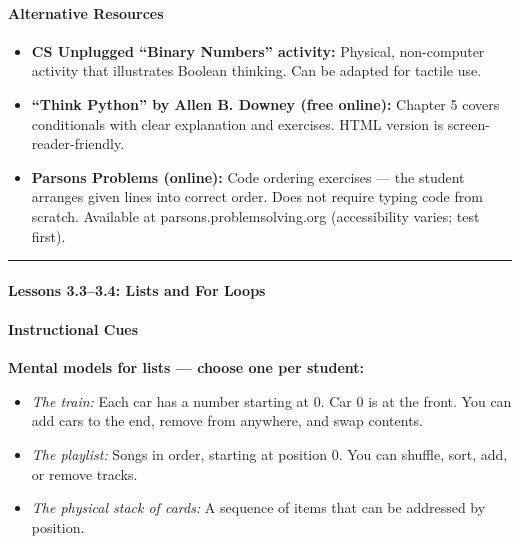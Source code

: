 \documentclass[
  justified,
  openright,
]{tufte-book}
\let\subsection\paragraph
\let\paragraph\paragraph
\let\subsection\paragraph
\let\paragraph\paragraph
\providecommand{\tightlist}{%
  \setlength{\itemsep}{0pt}\setlength{\parskip}{0pt}}
\begin{document}
\paragraph{Alternative Resources}\label{alternative-resources-2}

\begin{itemize}
\tightlist
\item
  \textbf{CS Unplugged ``Binary Numbers'' activity:} Physical,
  non-computer activity that illustrates Boolean thinking. Can be
  adapted for tactile use.
\item
  \textbf{``Think Python'' by Allen B. Downey (free online):} Chapter 5
  covers conditionals with clear explanation and exercises. HTML version
  is screen-reader-friendly.
\item
  \textbf{Parsons Problems (online):} Code ordering exercises --- the
  student arranges given lines into correct order. Does not require
  typing code from scratch. Available at parsons.problemsolving.org
  (accessibility varies; test first).
\end{itemize}

\begin{center}\rule{0.5\linewidth}{0.5pt}\end{center}

\subsection{Lessons 3.3--3.4: Lists and For
Loops}\label{lessons-3.33.4-lists-and-for-loops}

\paragraph{Instructional Cues}\label{instructional-cues-8}

\textbf{Mental models for lists --- choose one per student:}

\begin{itemize}
\tightlist
\item
  \emph{The train:} Each car has a number starting at 0. Car 0 is at the
  front. You can add cars to the end, remove from anywhere, and swap
  contents.
\item
  \emph{The playlist:} Songs in order, starting at position 0. You can
  shuffle, sort, add, or remove tracks.
\item
  \emph{The physical stack of cards:} A sequence of items that can be
  addressed by position.
\end{itemize}
\end{document}
